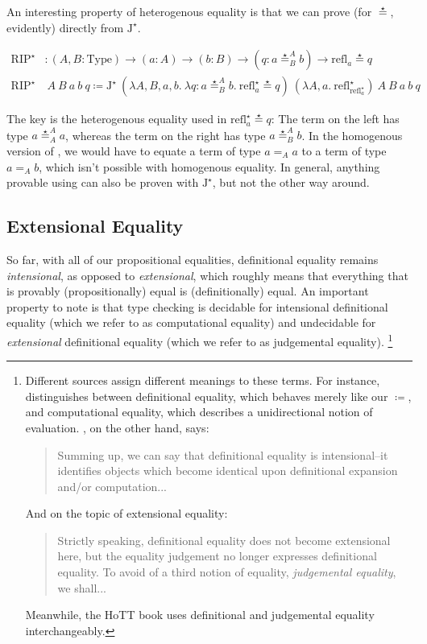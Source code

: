\documentclass{report}
\newcommand{\const}[1]{\text{#1}}
\newcommand{\Type}{\const{Type}}
\newcommand{\refl}{\const{refl}}
\newcommand{\jelim}{\const{J}\xspace}
\newcommand{\rip}{\const{RIP}\xspace}
\begin{document}
An interesting property of heterogenous equality is that we can prove \rip (for $\stareq$, evidently) directly from $\jelim^\star$.

\begin{align*}
    \rip^\star &: (A, B : \Type) \to (a : A) \to (b : B) \to (q : a \stareq^A_B b) \to \refl_a \stareq q \\
    \rip^\star &~ A ~ B ~ a ~ b ~ q \coloneqq \jelim^\star ~ (\lambda A, B, a, b. ~ \lambda q : a \stareq^A_B b. ~ \refl^\star_a \stareq q) ~ (\lambda A, a. ~ \refl^\star_{\refl^\star_a}) ~ A ~ B ~ a ~ b ~ q
\end{align*}

The key is the heterogenous equality used in $\refl^\star_a \stareq q$: The term on the left has type $a \stareq^A_A a$, whereas the term on the right has type $a \stareq^A_B b$. In the homogenous version of \jelim, we would have to equate a term of type $a =_A a$ to a term of type $a =_A b$, which isn't possible with homogenous equality. In general, anything provable using \jelim can also be proven with $\jelim^\star$, but not the other way around.

\subsection{Extensional Equality}\label{ext-eq}

So far, with all of our propositional equalities, definitional equality remains \emph{intensional}, as opposed to \emph{extensional}, which roughly means that everything that is provably (propositionally) equal is (definitionally) equal. An important property to note is that type checking is decidable for intensional definitional equality (which we refer to as computational equality) and undecidable for \emph{extensional} definitional equality (which we refer to as judgemental equality).%
\footnote{Different sources assign different meanings to these terms. For instance, \citet{nlab-equality} distinguishes between definitional equality, which behaves merely like our $\coloneqq$, and computational equality, which describes a unidirectional notion of evaluation. \citet{ext-concepts}, on the other hand, says:
\begin{quote}
    Summing up, we can say that definitional equality is intensional--it identifies objects which become identical upon definitional expansion and/or computation...
\end{quote}
And on the topic of extensional equality:
\begin{quote}
    Strictly speaking, definitional equality does not become extensional here, but the equality judgement no longer expresses definitional equality. To avoid of a third notion of equality, \emph{judgemental equality}, we shall...
\end{quote}
Meanwhile, the HoTT book \citep{hott-book} uses definitional and judgemental equality interchangeably.}
\end{document}
